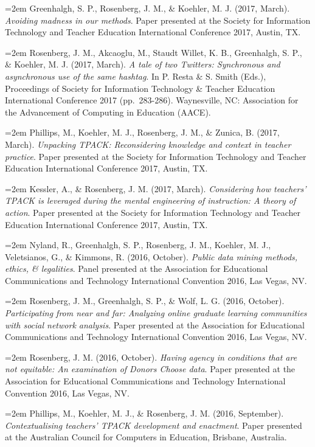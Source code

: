 \documentclass[]{article}
\begin{document}
\hangindent=2em Greenhalgh, S. P., Rosenberg, J. M., \& Koehler, M. J.
(2017, March). \emph{Avoiding madness in our methods}. Paper presented
at the Society for Information Technology and Teacher Education
International Conference 2017, Austin, TX.

\hangindent=2em Rosenberg, J. M., Akcaoglu, M., Staudt Willet, K. B.,
Greenhalgh, S. P., \& Koehler, M. J. (2017, March). \emph{A tale of two
Twitters: Synchronous and asynchronous use of the same hashtag}. In P.
Resta \& S. Smith (Eds.), Proceedings of Society for Information
Technology \& Teacher Education International Conference 2017
(pp.~283-286). Waynesville, NC: Association for the Advancement of
Computing in Education (AACE).

\hangindent=2em Phillips, M., Koehler, M. J., Rosenberg, J. M., \&
Zunica, B. (2017, March). \emph{Unpacking TPACK: Reconsidering knowledge
and context in teacher practice}. Paper presented at the Society for
Information Technology and Teacher Education International Conference
2017, Austin, TX.

\hangindent=2em Kessler, A., \& Rosenberg, J. M. (2017, March).
\emph{Considering how teachers' TPACK is leveraged during the mental
engineering of instruction: A theory of action}. Paper presented at the
Society for Information Technology and Teacher Education International
Conference 2017, Austin, TX.

\hangindent=2em Nyland, R., Greenhalgh, S. P., Rosenberg, J. M.,
Koehler, M. J., Veletsianos, G., \& Kimmons, R. (2016, October).
\emph{Public data mining methods, ethics, \& legalities}. Panel
presented at the Association for Educational Communications and
Technology International Convention 2016, Las Vegas, NV.

\hangindent=2em Rosenberg, J. M., Greenhalgh, S. P., \& Wolf, L. G.
(2016, October). \emph{Participating from near and far: Analyzing online
graduate learning communities with social network analysis}. Paper
presented at the Association for Educational Communications and
Technology International Convention 2016, Las Vegas, NV.

\hangindent=2em Rosenberg, J. M. (2016, October). \emph{Having agency in
conditions that are not equitable: An examination of Donors Choose
data}. Paper presented at the Association for Educational Communications
and Technology International Convention 2016, Las Vegas, NV.

\hangindent=2em Phillips, M., Koehler, M. J., \& Rosenberg, J. M. (2016,
September). \emph{Contextualising teachers' TPACK development and
enactment}. Paper presented at the Australian Council for Computers in
Education, Brisbane, Australia.
\end{document}
